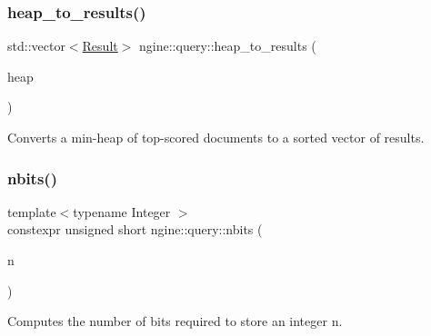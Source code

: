 \subsubsection{\texorpdfstring{heap\+\_\+to\+\_\+results()}{heap\_to\_results()}}
{\footnotesize\ttfamily std\+::vector$<$\hyperlink{structngine_1_1query_1_1Result}{Result}$>$ ngine\+::query\+::heap\+\_\+to\+\_\+results (\begin{DoxyParamCaption}\item[{\hyperlink{classngine_1_1MinHeap}{Min\+Heap}$<$ \hyperlink{structngine_1_1Score}{Score}, \hyperlink{structngine_1_1Doc}{Doc} $>$ \&}]{heap }\end{DoxyParamCaption})}



Converts a min-\/heap of top-\/scored documents to a sorted vector of results. 

\mbox{\label{namespacengine_1_1query_a42ebbff17494de704d3064596a66f59a}} 
\subsubsection{\texorpdfstring{nbits()}{nbits()}}
{\footnotesize\ttfamily template$<$typename Integer $>$ \\
constexpr unsigned short ngine\+::query\+::nbits (\begin{DoxyParamCaption}\item[{Integer}]{n }\end{DoxyParamCaption})}



Computes the number of bits required to store an integer n. 

